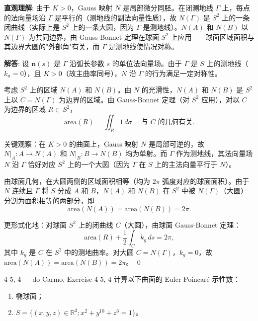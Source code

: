 \begin{solution}
\textbf{直观理解}: 由于 $K>0$，Gauss 映射 $N$ 是局部微分同胚。在闭测地线 $\Gamma$ 上，每点的法向量场沿 $\Gamma$ 是平行的（测地线的副法向量性质），故 $N(\Gamma)$ 是 $S^2$ 上的一条闭曲线（实际上是 $S^2$ 上的一条大圆，因为 $\Gamma$ 是测地线）。$N(A)$ 和 $N(B)$ 以 $N(\Gamma)$ 为共同边界，由 Gauss-Bonnet 定理在球面 $S^2$ 上应用——球面区域面积与其边界大圆的"外部角"有关，而 $\Gamma$ 是测地线使情况对称。

\textbf{解答}: 设 $\mathbf{n}(s)$ 是 $\Gamma$ 沿弧长参数 $s$ 的单位法向量场。由于 $\Gamma$ 是 $S$ 上的测地线（$k_n=0$），且 $K>0$（故主曲率同号），$N$ 沿 $\Gamma$ 的行为满足一定对称性。

考虑 $S^2$ 上的区域 $N(A)$ 和 $N(B)$。由 $N$ 的光滑性，$N(A)$ 和 $N(B)$ 是 $S^2$ 上以 $C = N(\Gamma)$ 为边界的区域。由 Gauss-Bonnet 定理（对 $S^2$ 应用），对以 $C$ 为边界的区域 $R \subset S^2$，
\[
\mathrm{area}(R) = \iint_R 1\, d\sigma = \text{与 } C \text{ 的几何有关}.
\]

关键观察：在 $K>0$ 的曲面上，Gauss 映射 $N$ 是局部可逆的，故 $N|_A: A \to N(A)$ 和 $N|_B: B \to N(B)$ 均为单射。而 $\Gamma$ 作为测地线，其法向量场 $N$ 沿 $\Gamma$ 恰好对应 $S^2$ 上的一个大圆（因为 $\Gamma$ 在 $S$ 上的主法向量平行于 $N$）。

由球面几何，在大圆两侧的区域面积相等（均为 $2\pi$ 弧度对应的球面面积）。由于 $N$ 连续且 $\Gamma$ 将 $S$ 分成 $A$ 和 $B$，$N(A)$ 和 $N(B)$ 在 $S^2$ 中被 $N(\Gamma)$（大圆）分割为面积相等的两部分，即
\[
\mathrm{area}(N(A)) = \mathrm{area}(N(B)) = 2\pi.
\]

更形式化地：对球面 $S^2$ 上的闭曲线 $C$（大圆），由球面 Gauss-Bonnet 定理：
\[
\mathrm{area}(R) + \frac{1}{2}\int_C k_g\, ds = 2\pi,
\]
其中 $k_g$ 是 $C$ 在 $S^2$ 中的测地曲率。对大圆 $C = N(\Gamma)$，$k_g = 0$，故 $\mathrm{area}(N(A)) = \mathrm{area}(N(B)) = 2\pi$。
\qed
\end{solution}

\begin{exercise}{4-5, 4 — do Carmo, Exercise 4-5, 4}
计算以下曲面的 Euler-Poincaré 示性数：
\begin{enumerate}
\item 椭球面；
\item[*] $S = \{(x,y,z) \in \mathbb{R}^3 ; x^2 + y^{10} + z^6 = 1\}$。
\end{enumerate}
\end{exercise}

